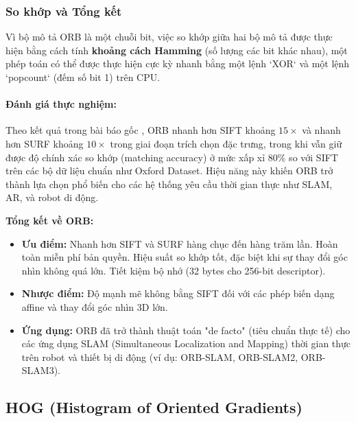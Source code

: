 \subsubsection{So khớp và Tổng kết}
\label{subsubsec:orb_matching_summary}
Vì bộ mô tả ORB là một chuỗi bit, việc so khớp giữa hai bộ mô tả được thực hiện bằng cách tính \textbf{khoảng cách Hamming} (số lượng các bit khác nhau), một phép toán có thể được thực hiện cực kỳ nhanh bằng một lệnh `XOR` và một lệnh `popcount` (đếm số bit 1) trên CPU.

\paragraph{Đánh giá thực nghiệm:}
Theo kết quả trong bài báo gốc \cite{Rublee2011}, ORB nhanh hơn SIFT khoảng $15\times$ và nhanh hơn SURF khoảng $10\times$ trong giai đoạn trích chọn đặc trưng, 
trong khi vẫn giữ được độ chính xác so khớp (matching accuracy) ở mức xấp xỉ $80\%$ so với SIFT trên các bộ dữ liệu chuẩn như Oxford Dataset. 
Hiệu năng này khiến ORB trở thành lựa chọn phổ biến cho các hệ thống yêu cầu thời gian thực như SLAM, AR, và robot di động.

\textbf{Tổng kết về ORB:}
\begin{itemize}
    \item \textbf{Ưu điểm:} Nhanh hơn SIFT và SURF hàng chục đến hàng trăm lần. Hoàn toàn miễn phí bản quyền. Hiệu suất so khớp tốt, đặc biệt khi sự thay đổi góc nhìn không quá lớn. Tiết kiệm bộ nhớ (32 bytes cho 256-bit descriptor).
    \item \textbf{Nhược điểm:} Độ mạnh mẽ không bằng SIFT đối với các phép biến dạng affine và thay đổi góc nhìn 3D lớn.
    \item \textbf{Ứng dụng:} ORB đã trở thành thuật toán "de facto" (tiêu chuẩn thực tế) cho các ứng dụng SLAM (Simultaneous Localization and Mapping) thời gian thực trên robot và thiết bị di động (ví dụ: ORB-SLAM, ORB-SLAM2, ORB-SLAM3).
\end{itemize}


\subsection{HOG (Histogram of Oriented Gradients)}
\label{subsec:hog}

